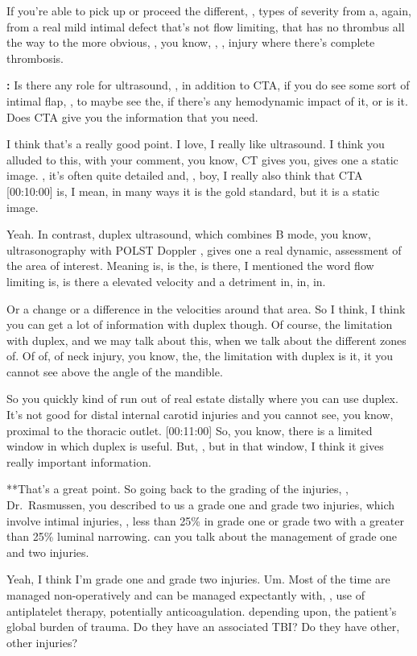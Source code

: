 \documentclass[
]{book}
\begin{document}
If you're able to pick up or proceed the different, , types of severity
from a, again, from a real mild intimal defect that's not flow limiting,
that has no thrombus all the way to the more obvious, , you know, , ,
injury where there's complete thrombosis.

\textbf{:} Is there any role
for ultrasound, , in addition to CTA, if you do see some sort of intimal
flap, , to maybe see the, if there's any hemodynamic impact of it, or is
it. Does CTA give you the information that you need.

I think
that's a really good point. I love, I really like ultrasound. I think
you alluded to this, with your comment, you know, CT gives you,
gives one a static image. , it's often quite detailed and, , boy, I
really also think that CTA {[}00:10:00{]} is, I mean, in many ways it is the
gold standard, but it is a static image.

Yeah. In contrast, duplex ultrasound, which combines B mode, you know,
ultrasonography with POLST Doppler , gives one a real dynamic,
assessment of the area of interest. Meaning is, is the, is there, I
mentioned the word flow limiting is, is there a elevated velocity and a
detriment in, in, in.

Or a change or a difference in the velocities around that area. So I
think, I think you can get a lot of information with duplex though. Of
course, the limitation with duplex, and we may talk about this, when
we talk about the different zones of. Of of, of neck injury, you know,
the, the limitation with duplex is it, it you cannot see above the angle
of the mandible.

So you quickly kind of run out of real estate distally where you can use
duplex. It's not good for distal internal carotid injuries and you
cannot see, you know, proximal to the thoracic outlet. {[}00:11:00{]} So,
you know, there is a limited window in which duplex is useful. But, ,
but in that window, I think it gives really important information.

**That's a great point. So going
back to the grading of the injuries, , Dr.~Rasmussen, you described to
us a grade one and grade two injuries, which involve intimal injuries, ,
less than 25\% in grade one or grade two with a greater than 25\% luminal
narrowing. can you talk about the management of grade one and two
injuries.

Yeah, I think
I'm grade one and grade two injuries. Um. Most of the time are managed
non-operatively and can be managed expectantly with, , use of
antiplatelet therapy, potentially anticoagulation. depending upon,
the patient's global burden of trauma. Do they have an associated
TBI? Do they have other, other injuries?
\end{document}
